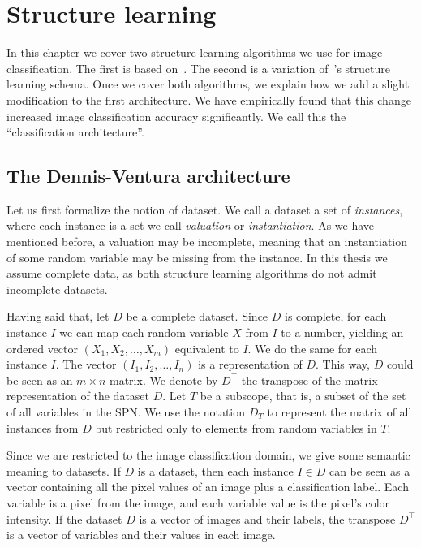 \chapter{Structure learning}\label{chp:structure}

In this chapter we cover two structure learning algorithms we use for image classification. The
first is based on~\cite{clustering}. The second is a variation of~\cite{gens-domingos}'s structure
learning schema. Once we cover both algorithms, we explain how we add a slight modification to the
first architecture. We have empirically found that this change increased image classification
accuracy significantly. We call this the ``classification architecture''.

\section{The Dennis-Ventura architecture}\label{section:dv}

Let us first formalize the notion of dataset. We call a dataset a set of \textit{instances}, where
each instance is a set we call \textit{valuation} or \textit{instantiation}. As we have mentioned
before, a valuation may be incomplete, meaning that an instantiation of some random variable may be
missing from the instance. In this thesis we assume complete data, as both structure learning
algorithms do not admit incomplete datasets.

Having said that, let $D$ be a complete dataset. Since $D$ is complete, for each instance $I$ we
can map each random variable $X$ from $I$ to a number, yielding an ordered vector $(X_1,X_2,\ldots,
X_m)$ equivalent to $I$. We do the same for each instance $I$. The vector $(I_1,I_2,\ldots, I_n)$
is a representation of $D$. This way, $D$ could be seen as an $m\times n$ matrix. We denote by
$D^\intercal$ the transpose of the matrix representation of the dataset $D$.  Let $T$ be a
subscope, that is, a subset of the set of all variables in the SPN\@. We use the notation $D_T$ to
represent the matrix of all instances from $D$ but restricted only to elements from random
variables in $T$.

Since we are restricted to the image classification domain, we give some semantic meaning to
datasets. If $D$ is a dataset, then each instance $I\in D$ can be seen as a vector containing all
the pixel values of an image plus a classification label. Each variable is a pixel from the image,
and each variable value is the pixel's color intensity. If the dataset $D$ is a vector of images
and their labels, the transpose $D^\intercal$ is a vector of variables and their values in each
image.

